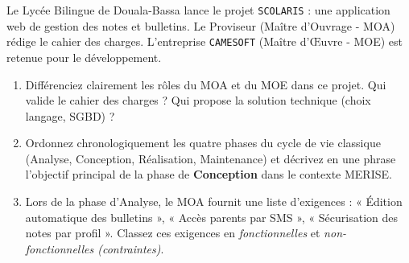 \documentclass[11pt]{article}
\begin{document}
\begin{exercice}
Le Lycée Bilingue de Douala-Bassa lance le projet \texttt{SCOLARIS} : une application web de gestion des notes et bulletins. Le Proviseur (Maître d'Ouvrage - MOA) rédige le cahier des charges. L'entreprise \texttt{CAMESOFT} (Maître d'Œuvre - MOE) est retenue pour le développement.
\begin{enumerate}
    \item Différenciez clairement les rôles du MOA et du MOE dans ce projet. Qui valide le cahier des charges ? Qui propose la solution technique (choix langage, SGBD) ?
    \item Ordonnez chronologiquement les quatre phases du cycle de vie classique (Analyse, Conception, Réalisation, Maintenance) et décrivez en une phrase l'objectif principal de la phase de \textbf{Conception} dans le contexte MERISE.
    \item Lors de la phase d'Analyse, le MOA fournit une liste d'exigences : « Édition automatique des bulletins », « Accès parents par SMS », « Sécurisation des notes par profil ». Classez ces exigences en \textit{fonctionnelles} et \textit{non-fonctionnelles (contraintes)}.
\end{enumerate}
\end{exercice}
\end{document}
